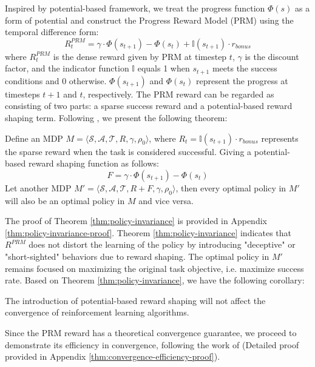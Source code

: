 Inspired by potential-based framework, we treat the progress function $\Phi(s)$ as a form of potential and construct the Progress Reward Model (PRM) using the temporal difference form:
\begin{equation}
    R_t^{PRM} = \gamma \cdot \Phi(s_{t+1}) - \Phi(s_{t}) + \mathbb{I}(s_{t+1})\cdot r_{bonus}
\end{equation}
where $R_t^{PRM}$ is the dense reward given by PRM at timestep $t$, $\gamma$ is the discount factor, and the indicator function $\mathbb{I}$ equals 1 when $s_{t+1}$ meets the success conditions and 0 otherwise. $\Phi(s_{t+1})$ and $\Phi(s_{t})$ represent the progress at timesteps $t+1$ and $t$, respectively.
The PRM reward can be regarded as consisting of two parts: a sparse success reward and a potential-based reward shaping term. Following \cite{ng1999policy}, we present the following theorem:

\begin{theorem}\label{thm:policy-invariance}
Define an MDP \( M = \langle \mathcal{S}, \mathcal{A}, \mathcal{T}, R, \gamma, \rho_0 \rangle \), where $R_t = \mathbb{I}(s_{t+1})\cdot r_{bonus}$ represents the sparse reward when the task is considered successful.
Giving a potential-based reward shaping function as follows:
\begin{equation*}
    F =  \gamma \cdot \Phi(s_{t+1}) - \Phi(s_{t})
\end{equation*}
Let another MDP \( M' = \langle \mathcal{S}, \mathcal{A}, \mathcal{T}, R+F, \gamma, \rho_0 \rangle \), then every optimal policy in $M'$ will also be an optimal policy in $M$ and vice versa.
\end{theorem}

The proof of Theorem \ref{thm:policy-invariance} is provided in Appendix \ref{thm:policy-invariance-proof}. Theorem \ref{thm:policy-invariance} indicates that $R^{PRM}$  does not distort the learning of the policy by introducing "deceptive" or "short-sighted" behaviors due to reward shaping.
The optimal policy in $M'$ remains focused on maximizing the original task objective, i.e. maximize success rate.
Based on Theorem \ref{thm:policy-invariance}, we have the following corollary:

\begin{corollary}
The introduction of potential-based reward shaping will not affect the convergence of reinforcement learning algorithms.
\end{corollary}

Since the PRM reward has a theoretical convergence guarantee, we proceed to demonstrate its efficiency in convergence, following the work of \cite{Wiewiora_2003} (Detailed proof provided in  Appendix \ref{thm:convergence-efficiency-proof}).

